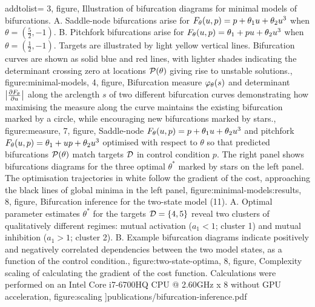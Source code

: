     addtolist={
        3, figure, {Illustration of bifurcation diagrams for minimal models of bifurcations. A. Saddle-node bifurcations arise for $F_{\theta}(u,p) = p + \theta_{1}u+\theta_{2}u^3$ when $\theta = (\frac{5}{2},-1)$. B. Pitchfork bifurcations arise for $F_{\theta}(u,p) = \theta_{1} + p u+\theta_{2}u^3$ when $\theta=(\frac{1}{2},-1)$. Targets are illustrated by light yellow vertical lines. Bifurcation curves are shown as solid blue and red lines, with lighter shades indicating the determinant crossing zero at locations $\mathcal{P}(\theta)$ giving rise to unstable solutions.}, figure:minimal-models,
        4, figure, {Bifurcation measure $\varphi_{\theta}(s)$ and determinant $\left| \frac{\partial F_{\theta}}{\partial u} \right|$ along the arclength $s$ of two different bifurcation curves demonstrating how maximising the measure along the curve maintains the existing bifurcation marked by a circle, while encouraging new bifurcations marked by stars.}, figure:measure,
        7, figure, {Saddle-node $F_{\theta}(u,p) = p + \theta_{1}u+\theta_{2}u^3$ and pitchfork $F_{\theta}(u,p) = \theta_{1} + u p +\theta_{2}u^3$ optimised with respect to $\theta$ so that predicted bifurcations $\mathcal{P}(\theta)$ match targets $\mathcal{D}$ in control condition $p$. The right panel shows bifurcations diagrams for the three optimal $\theta^*$ marked by stars on the left panel. The optimisation trajectories in white follow the gradient of the cost, approaching the black lines of global minima in the left panel}, figure:minimal-models:results,
        8, figure, {Bifurcation inference for the two-state model (11). A. Optimal parameter estimates $\theta^*$ for the targets $\mathcal{D}=\{4,5\}$ reveal two clusters of qualitatively different regimes: mutual activation ($a_1 < 1$; cluster 1) and mutual inhibition ($a_1 > 1$; cluster 2). B. Example bifurcation diagrams indicate positively and negatively correlated dependencies between the two model states, as a function of the control condition.}, figure:two-state-optima,
        8, figure, {Complexity scaling of calculating the gradient of the cost function. Calculations were performed on an Intel Core i7-6700HQ CPU @ 2.60GHz x 8 without GPU acceleration}, figure:scaling
}]{publications/bifurcation-inference.pdf}